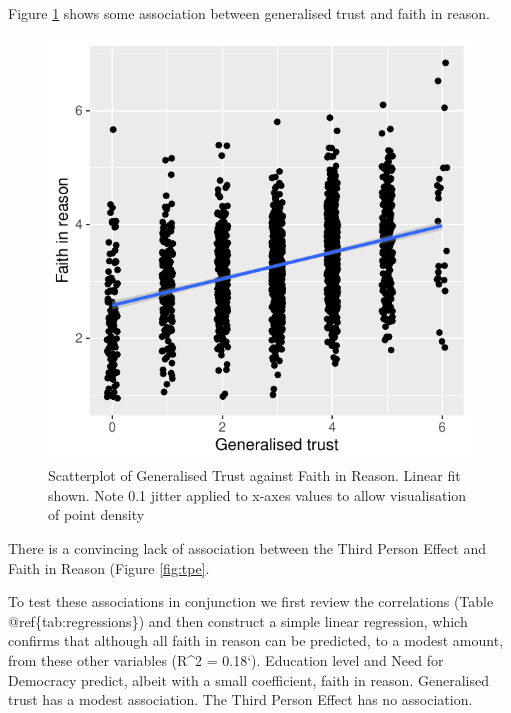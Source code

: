 \documentclass[
  ,jou,floatsintext]{apa6}
\begin{document}
Figure \ref{fig:generalisetrust} shows some association between generalised trust and faith in reason.

\begin{figure}

{\centering \includegraphics[width=0.75\linewidth]{faithinreason_files/figure-latex/generalisetrust-1} 

}

\caption{Scatterplot of Generalised Trust against Faith in Reason. Linear fit shown. Note 0.1 jitter applied to x-axes values to allow visualisation of point density}\label{fig:generalisetrust}
\end{figure}

There is a convincing lack of association between the Third Person Effect and Faith in Reason (Figure \ref{fig:tpe}.

To test these associations in conjunction we first review the correlations (Table @ref\{tab:regressions\}) and then construct a simple linear regression, which confirms that although all faith in reason can be predicted, to a modest amount, from these other variables (R\^{}2 = 0.18`). Education level and Need for Democracy predict, albeit with a small coefficient, faith in reason. Generalised trust has a modest association. The Third Person Effect has no association.
\end{document}
